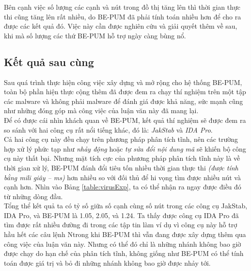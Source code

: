 Bên cạnh việc số lượng các cạnh và nút trong đồ thị tăng lên thì thời gian thực thi cũng tăng lên rất nhiều, do BE-PUM đã phải tính toán nhiều hơn để cho ra được các kết quả đó. Việc này cần được nghiên cứu và giải quyết thêm về sau, khi mà số lượng các thứ BE-PUM hỗ trợ ngày càng bùng nổ.

	\subsection {Kết quả sau cùng}

Sau quá trình thực hiện công việc xây dựng và mở rộng cho hệ thống BE-PUM, toàn bộ phần hiện thực cộng thêm đã được đem ra chạy thí nghiệm trên một tập các malware và không phải malware để đánh giá được khả năng, sức mạnh cũng như những đóng góp mà công việc của luận văn này đã mang lại. \\

Để có được cái nhìn khách quan về BE-PUM, kết quả thí nghiệm sẽ được đem ra so sánh với hai công cụ rất nổi tiếng khác, đó là: \textit{JakStab} và \textit{IDA Pro}.\\

Cả hai công cụ này đều chạy trên phương pháp phân tích tĩnh, nên các trường hợp xử lý phức tạp như \textit{nhảy động} hoặc \textit{tự sửa đổi nội dung mã} sẽ khiến bộ công cụ này thất bại. Nhưng mặt tích cực của phương pháp phân tích tĩnh này là về thời gian xử lý, BE-PUM đánh đổi tiêu tốn nhiều thời gian thực thi \textit{(được tính bằng mili giây -- ms)} hơn nhiều so với đối thủ để hi vọng tìm được nhiều nút và cạnh hơn. Nhìn vào Bảng \ref{table:virusExp}, ta có thể nhận ra ngay được điều đó từ những dòng đầu. \\

Tổng thể kết quả ta có tỷ số giữa số cạnh cùng số nút trong các công cụ JakStab, IDA Pro, và BE-PUM là 1.05, 2.05, và 1.24. Ta thấy được công cụ IDA Pro đã tìm được rất nhiều đường đi trong các tập tin làm ví dụ vì công cụ này hỗ trợ hầu hết các câu lệnh Ntrong khi BE-PUM thì vẫn đang được xây dựng thêm qua công việc của luận văn này. Nhưng có thể đó chỉ là những nhánh không bao giờ được chạy do hạn chế của phân tích tĩnh, không giống như BE-PUM có thể tính toán được giá trị và bỏ đi những nhánh không bao giờ được nhảy tới.

